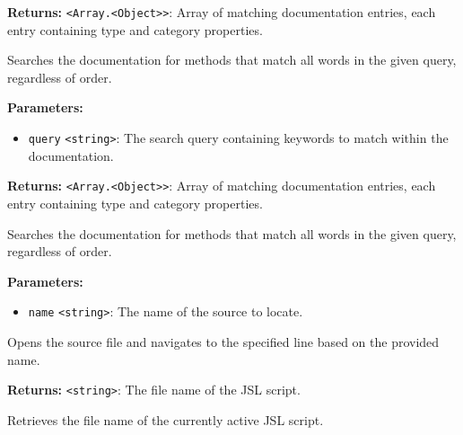\documentclass[12pt,a4paper]{article}
\begin{document}
\noindent \textbf{Returns:} \texttt{<Array.<Object>>}: Array of matching documentation entries, each entry containing \textasciigrave{}type\textasciigrave{} and \textasciigrave{}category\textasciigrave{} properties.

\noindent Searches the documentation for methods that match all words in the given query, regardless of order.

\vspace{5mm}
\noindent {}


\noindent \textbf{Parameters:}
\begin{itemize}
  \item \texttt{query} \texttt{<string>}: The search query containing keywords to match within the documentation.
\end{itemize}

\noindent \textbf{Returns:} \texttt{<Array.<Object>>}: Array of matching documentation entries, each entry containing \textasciigrave{}type\textasciigrave{} and \textasciigrave{}category\textasciigrave{} properties.

\noindent Searches the documentation for methods that match all words in the given query, regardless of order.

\vspace{5mm}
\noindent {}


\noindent \textbf{Parameters:}
\begin{itemize}
  \item \texttt{name} \texttt{<string>}: The name of the source to locate.
\end{itemize}

\noindent Opens the source file and navigates to the specified line based on the provided name.

\vspace{5mm}
\noindent {}


\noindent \textbf{Returns:} \texttt{<string>}: The file name of the JSL script.

\noindent Retrieves the file name of the currently active JSL script.
\end{document}
